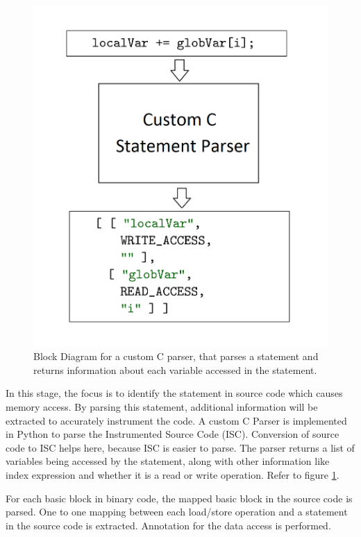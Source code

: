 \begin{figure}[h]
\centering
\includegraphics[width=.5\textwidth]{figures/cParser.png}
\caption{Block Diagram for a custom C parser, that parses a statement and returns information about each variable accessed in the statement.}
\label{fig:customCParser}
\end{figure}

In this stage, the focus is to identify the statement in source code which causes memory access. By parsing this statement, additional information will be extracted to accurately instrument the code. A custom C Parser is implemented in Python to parse the Instrumented Source Code (ISC). Conversion of source code to ISC helps here, because ISC is easier to parse. The parser returns a list of variables being accessed by the statement, along with other information like index expression and whether it is a read or write operation. Refer to figure \ref{fig:customCParser}.

For each basic block in binary code, the mapped basic block in the source code is parsed. One to one mapping between each load/store operation and a statement in the source code is extracted. Annotation for the data access is performed. 

